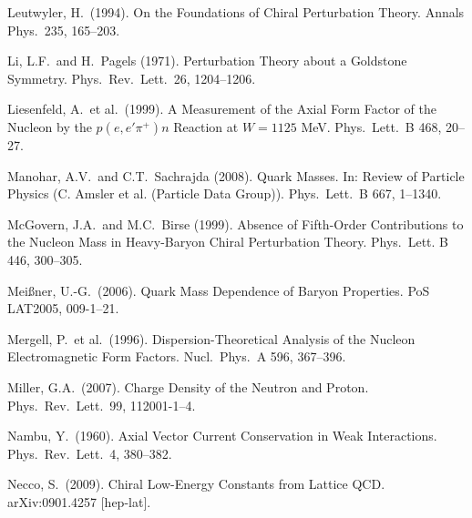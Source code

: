 \documentclass[twoside,12pt]{article}
\begin{document}
\begin{thebibliography}{}
Leutwyler, H.~(1994).
On the Foundations of Chiral Perturbation Theory.
Annals Phys.\ 235, 165--203.

Li, L.F.~and H.~Pagels (1971).
Perturbation Theory about a Goldstone Symmetry.
Phys.\ Rev.\ Lett.\  26, 1204--1206.

Liesenfeld, A.~et al.~(1999).
A Measurement of the Axial Form Factor of the Nucleon by the  $p(e,e' \pi^+)n$
Reaction at $W = 1125$ MeV.
Phys.\ Lett.\  B 468, 20--27.

Manohar, A.V.~and C.T.~Sachrajda (2008).
Quark Masses. In: Review of Particle Physics (C. Amsler et al. (Particle Data Group)).
Phys.\ Lett.\ B 667, 1--1340.

McGovern, J.A.~and M.C.~Birse (1999).
Absence of Fifth-Order Contributions to the Nucleon Mass in
Heavy-Baryon Chiral Perturbation Theory.
Phys.\ Lett.  B 446, 300--305.

Mei{\ss}ner, U.-G.~(2006).
Quark Mass Dependence of Baryon Properties.
PoS LAT2005, 009-1--21.

Mergell, P.~et al.~(1996).
Dispersion-Theoretical Analysis of the Nucleon Electromagnetic
Form Factors.
Nucl.\ Phys.\  A 596, 367--396.

Miller, G.A.~(2007).
Charge Density of the Neutron and Proton.
Phys.\ Rev.\ Lett.\  99, 112001-1--4.

Nambu, Y.~(1960).
Axial Vector Current Conservation in Weak Interactions.
Phys.\ Rev.\ Lett.\  4, 380--382.

Necco, S.~(2009).
Chiral Low-Energy Constants from Lattice QCD.
arXiv:0901.4257 [hep-lat].


\end{thebibliography}
\end{document}
